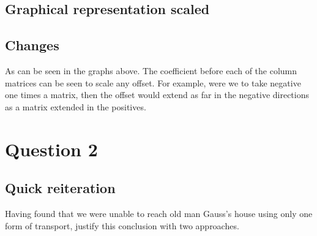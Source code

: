 \documentclass{article}
\begin{document}
    \subsection{Graphical representation scaled}
        \begin{minipage}{0.49\textwidth}
        \centering
    \end{minipage}
    \hfill %
    \begin{minipage}{0.49\textwidth}
        \centering
    \end{minipage}%
    \subsection{Changes}
    As can be seen in the graphs above. The coefficient before each of the column
    matrices can be seen to scale any offset. For example, were we to take negative
    one times a matrix, then the offset would extend as far in the negative directions
    as a matrix extended in the positives.
\section{Question 2}
    \subsection{Quick reiteration}
    Having found that we were unable to reach old man Gauss's house using only
    one form of transport, justify this conclusion with two approaches.
\end{document}
